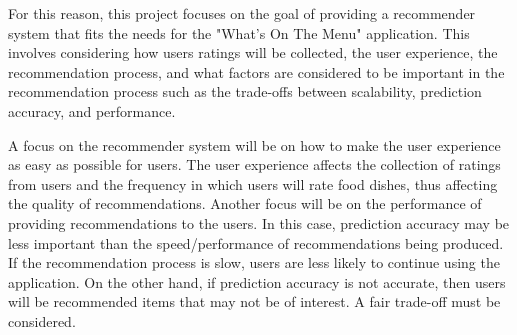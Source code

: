For this reason, this project focuses on the goal of providing a recommender system that fits the needs for the "What's On The Menu" application. This involves considering how users ratings will be collected, the user experience, the recommendation process, and what factors are considered to be important in the recommendation process such as the trade-offs between scalability, prediction accuracy, and performance.

A focus on the recommender system will be on how to make the user experience as easy as possible for users. The user experience affects the collection of ratings from users and the frequency in which users will rate food dishes, thus affecting the quality of recommendations. Another focus will be on the performance of providing recommendations to the users. In this case, prediction accuracy may be less important than the speed/performance of recommendations being produced. If the recommendation process is slow, users are less likely to continue using the application. On the other hand, if prediction accuracy is not accurate, then users will be recommended items that may not be of interest. A fair trade-off must be considered. 






